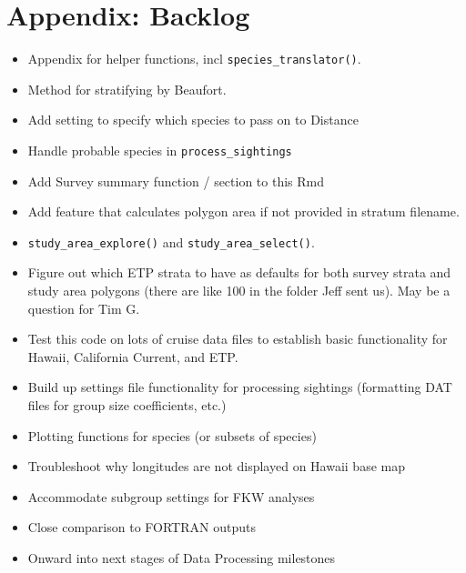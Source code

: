 \documentclass[
]{book}
\begin{document}
\hypertarget{backlog}{%
\chapter{Appendix: Backlog}\label{backlog}}

\begin{itemize}
\item
  Appendix for helper functions, incl \texttt{species\_translator()}.
\item
  Method for stratifying by Beaufort.
\item
  Add setting to specify which species to pass on to Distance
\item
  Handle probable species in \texttt{process\_sightings}
\item
  Add Survey summary function / section to this Rmd
\item
  Add feature that calculates polygon area if not provided in stratum filename.
\item
  \texttt{study\_area\_explore()} and \texttt{study\_area\_select()}.
\item
  Figure out which ETP strata to have as defaults for both survey strata and study area polygons (there are like 100 in the folder Jeff sent us). May be a question for Tim G.
\item
  Test this code on lots of cruise data files to establish basic functionality for Hawaii, California Current, and ETP.
\item
  Build up settings file functionality for processing sightings (formatting DAT files for group size coefficients, etc.)
\item
  Plotting functions for species (or subsets of species)
\item
  Troubleshoot why longitudes are not displayed on Hawaii base map
\item
  Accommodate subgroup settings for FKW analyses
\item
  Close comparison to FORTRAN outputs
\item
  Onward into next stages of Data Processing milestones
\end{itemize}

  
\end{document}
